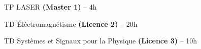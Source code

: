 \documentclass[9pt,a4paper,academicons]{altacv}
\begin{document}
\begin{fullwidth}
  \divider

\begin{cvlistdescription}
    \item TP LASER \textbf{(Master 1)} -- 4h
    \item TD \'Eléctromagnétisme \textbf{(Licence 2)} -- 20h
    \item TD Systèmes et Signaux pour la Physique \textbf{(Licence 3)} -- 10h
\end{cvlistdescription}
  \divider
\end{fullwidth}
\end{document}
